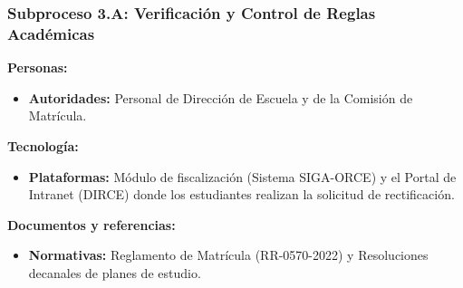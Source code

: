 \subsubsection{Subproceso 3.A: Verificación y Control de Reglas Académicas}

\textbf{Personas:}
\begin{itemize}
    \item \textbf{Autoridades:} Personal de Direcci\'on de Escuela y de la Comisi\'on de Matr\'icula. 
\end{itemize}

\textbf{Tecnolog\'ia:}
\begin{itemize}
    \item \textbf{Plataformas:} M\'odulo de fiscalizaci\'on (Sistema SIGA-ORCE) y el Portal de Intranet (DIRCE) donde los estudiantes realizan la solicitud de rectificaci\'on. 
\end{itemize}

\textbf{Documentos y referencias:}
\begin{itemize}
    \item \textbf{Normativas:} Reglamento de Matr\'icula (RR-0570-2022) y Resoluciones decanales de planes de estudio.
\end{itemize}
